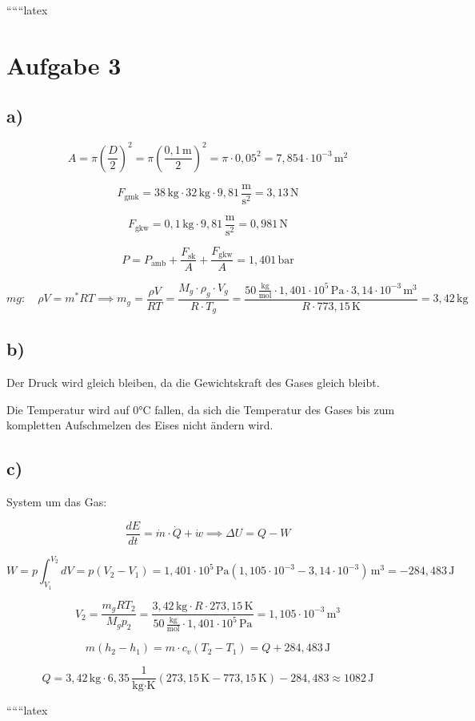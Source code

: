 
``````latex


\section*{Aufgabe 3}

\subsection*{a)}

\[
A = \pi \left( \frac{D}{2} \right)^2 = \pi \left( \frac{0,1\, \text{m}}{2} \right)^2 = \pi \cdot 0,05^2 = 7,854 \cdot 10^{-3} \, \text{m}^2
\]

\[
F_{\text{gmk}} = 38 \, \text{kg} \cdot 32 \, \text{kg} \cdot 9,81 \, \frac{\text{m}}{\text{s}^2} = 3,13 \, \text{N}
\]

\[
F_{\text{gkw}} = 0,1 \, \text{kg} \cdot 9,81 \, \frac{\text{m}}{\text{s}^2} = 0,981 \, \text{N}
\]

\[
P = P_{\text{amb}} + \frac{F_{\text{sk}}}{A} + \frac{F_{\text{gkw}}}{A} = 1,401 \, \text{bar}
\]

\[
mg: \quad \rho V = m^* RT \implies m_g = \frac{\rho V}{RT} = \frac{M_g \cdot \rho_g \cdot V_g}{R \cdot T_g} = \frac{50 \, \frac{\text{kg}}{\text{mol}} \cdot 1,401 \cdot 10^5 \, \text{Pa} \cdot 3,14 \cdot 10^{-3} \, \text{m}^3}{R \cdot 773,15 \, \text{K}} = 3,42 \, \text{kg}
\]

\subsection*{b)}

Der Druck wird gleich bleiben, da die Gewichtskraft des Gases gleich bleibt.

Die Temperatur wird auf 0°C fallen, da sich die Temperatur des Gases bis zum kompletten Aufschmelzen des Eises nicht ändern wird.

\subsection*{c)}

System um das Gas:

\[
\frac{dE}{dt} = \dot{m} \cdot \dot{Q} + \dot{w} \implies \Delta U = Q - W
\]

\[
W = p \int_{V_1}^{V_2} dV = p (V_2 - V_1) = 1,401 \cdot 10^5 \, \text{Pa} (1,105 \cdot 10^{-3} - 3,14 \cdot 10^{-3}) \, \text{m}^3 = -284,483 \, \text{J}
\]

\[
V_2 = \frac{m_g RT_2}{M_g p_2} = \frac{3,42 \, \text{kg} \cdot R \cdot 273,15 \, \text{K}}{50 \, \frac{\text{kg}}{\text{mol}} \cdot 1,401 \cdot 10^5 \, \text{Pa}} = 1,105 \cdot 10^{-3} \, \text{m}^3
\]

\[
m (h_2 - h_1) = m \cdot c_v (T_2 - T_1) = Q + 284,483 \, \text{J}
\]

\[
Q = 3,42 \, \text{kg} \cdot 6,35 \, \frac{1}{\text{kg} \cdot \text{K}} (273,15 \, \text{K} - 773,15 \, \text{K}) - 284,483 \approx 1082 \, \text{J}
\]

``````latex


